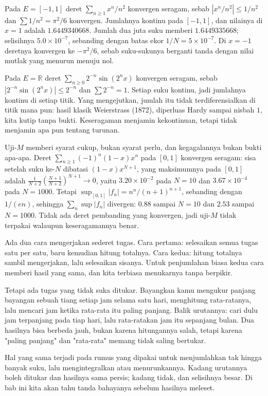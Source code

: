 \begin{contoh}
Pada $E=[-1,1]$ deret $\sum_{n\ge1}x^n/n^2$ konvergen seragam, sebab
$|x^n/n^2|\le1/n^2$ dan $\sum1/n^2=\pi^2/6$ konvergen. Jumlahnya kontinu pada
$[-1,1]$, dan nilainya di $x=1$ adalah $1.6449340668$. Jumlah dua juta suku
memberi $1.6449335668$; selisihnya $5.0\times10^{-7}$, sebanding dengan batas
ekor $1/N=5\times10^{-7}$. Di $x=-1$ deretnya konvergen ke $-\pi^2/6$, sebab
suku-sukunya berganti tanda dengan nilai mutlak yang menurun menuju nol.
\end{contoh}

\begin{contoh}
Pada $E=\mathbb{R}$ deret $\sum_{n\ge0}2^{-n}\sin(2^n x)$ konvergen seragam,
sebab $|2^{-n}\sin(2^n x)|\le2^{-n}$ dan $\sum2^{-n}=1$. Setiap suku kontinu,
jadi jumlahnya kontinu di setiap titik. Yang mengejutkan, jumlah itu tidak
terdiferensialkan di titik mana pun: hasil klasik Weierstrass (1872), diperluas
Hardy sampai nisbah $1$, kita kutip tanpa bukti. Keseragaman menjamin
kekontinuan, tetapi tidak menjamin apa pun tentang turunan.
\end{contoh}

\begin{catatan}
Uji-$M$ memberi syarat cukup, bukan syarat perlu, dan kegagalannya bukan bukti
apa-apa. Deret $\sum_{n\ge1}(-1)^n(1-x)x^n$ pada $[0,1]$ konvergen seragam:
sisa setelah suku ke-$N$ dibatasi $(1-x)x^{N+1}$, yang maksimumnya pada $[0,1]$
adalah $\tfrac{1}{N+2}\left(\tfrac{N+1}{N+2}\right)^{N+1}\to0$, yaitu
$3.20\times10^{-2}$ pada $N=10$ dan $3.67\times10^{-4}$ pada $N=1000$. Tetapi
$\sup_{[0,1]}|f_n|=n^n/(n+1)^{n+1}$, sebanding dengan $1/(en)$, sehingga
$\sum_n\sup|f_n|$ divergen: $0.88$ sampai $N=10$ dan $2.53$ sampai $N=1000$.
Tidak ada deret pembanding yang konvergen, jadi uji-$M$ tidak terpakai walaupun
keseragamannya benar.
\end{catatan}

\begin{untukanak}
Ada dua cara mengerjakan sederet tugas. Cara pertama: selesaikan semua tugas
satu per satu, baru kemudian hitung totalnya. Cara kedua: hitung totalnya sambil
mengerjakan, lalu selesaikan sisanya. Untuk penjumlahan biasa kedua cara memberi
hasil yang sama, dan kita terbiasa menukarnya tanpa berpikir.

Tetapi ada tugas yang tidak suka ditukar. Bayangkan kamu mengukur panjang
bayangan sebuah tiang setiap jam selama satu hari, menghitung rata-ratanya, lalu
mencari jam ketika rata-rata itu paling panjang. Balik urutannya: cari dulu jam
terpanjang pada tiap hari, lalu rata-ratakan jam itu sepanjang bulan. Dua
hasilnya bisa berbeda jauh, bukan karena hitungannya salah, tetapi karena
"paling panjang" dan "rata-rata" memang tidak saling bertukar.

Hal yang sama terjadi pada rumus yang dipakai untuk menjumlahkan tak hingga
banyak suku, lalu mengintegralkan atau menurunkannya. Kadang urutannya boleh
ditukar dan hasilnya sama persis; kadang tidak, dan selisihnya besar. Di bab ini
kita akan tahu tanda bahayanya sebelum hasilnya meleset.
\end{untukanak}

